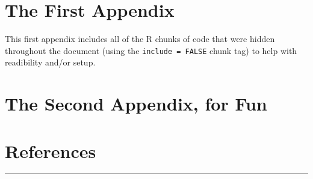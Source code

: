 \documentclass[11pt,oneside]{bristolthesis}
\begin{document}
\appendix

\hypertarget{the-first-appendix}{%
\chapter{The First Appendix}\label{the-first-appendix}}

This first appendix includes all of the R chunks of code that were hidden throughout the document (using the \texttt{include\ =\ FALSE} chunk tag) to help with readibility and/or setup.

\hypertarget{the-second-appendix-for-fun}{%
\chapter{The Second Appendix, for Fun}\label{the-second-appendix-for-fun}}

\backmatter

\hypertarget{references}{%
\chapter*{References}\label{references}}


\noindent

\setlength{\parindent}{-0.20in}
\setlength{\leftskip}{0.20in}
\setlength{\parskip}{8pt}
\begin{center}\rule{0.5\linewidth}{0.5pt}\end{center}
\end{document}
